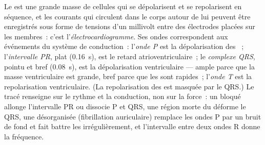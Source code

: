 \begin{proposition}[L'électrocardiogramme]\label{prop:b2:heart:ecg}
Le  est une grande masse de cellules qui se dépolarisent et se
repolarisent en séquence, et les courants qui circulent dans le corps
autour de lui peuvent être enregistrés sous forme de tensions d'un
millivolt entre des électrodes placées sur les membres~: c'est
l'\emph{électrocardiogramme}. Ses ondes correspondent aux événements du
système de conduction~: l'\emph{onde P} est la dépolarisation des
~; l'\emph{intervalle PR}, plat (\qty{0.16}{s}), est le
retard atrioventriculaire~; le \emph{complexe QRS}, pointu et bref
(\qty{0.08}{s}), est la dépolarisation ventriculaire --- ample parce que
la masse ventriculaire est grande, bref parce que les 
sont rapides~; l'\emph{onde T} est la repolarisation ventriculaire. (La
repolarisation des  est masquée par le QRS.) Le tracé
renseigne sur le rythme et la conduction, non sur la force~: un  bloqué allonge l'intervalle PR ou dissocie P et QRS,
une région morte du  déforme le QRS, une 
désorganisée (fibrillation auriculaire) remplace les ondes P par un
bruit de fond et fait battre les  irrégulièrement, et
l'intervalle entre deux ondes R donne la fréquence.
\end{proposition}

